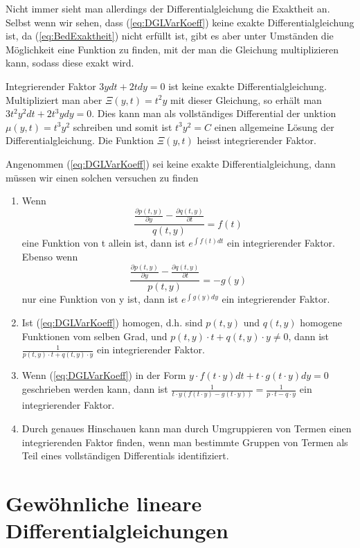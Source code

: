 Nicht immer sieht man allerdings der Differentialgleichung die Exaktheit an.
Selbst wenn wir sehen, dass (\ref{eq:DGLVarKoeff}) keine exakte
Differentialgleichung ist, da (\ref{eq:BedExaktheit}) nicht erfüllt ist, gibt
es aber unter Umständen die Möglichkeit eine Funktion zu finden, mit der man
die Gleichung multiplizieren kann, sodass diese exakt wird. 
\begin{note}{Integrierender Faktor}
  $3ydt+2tdy=0$ ist keine exakte Differentialgleichung. Multipliziert man aber
  $\Xi(y,t)=t^2y$ mit dieser Gleichung, so erhält man $3t^2y^2dt+2t^3ydy=0$.
  Dies kann man als vollständiges Differential der unktion $\mu(y,t)=t^3y^2$
  schreiben und somit ist $t^3y^2=C$ einen allgemeine Lösung der
  Differentialgleichung. Die Funktion $\Xi(y,t)$ heisst integrierender Faktor.
\end{note}
Angenommen (\ref{eq:DGLVarKoeff}) sei keine exakte Differentialgleichung, 
dann müssen wir einen solchen versuchen zu finden
\begin{enumerate}
    \item Wenn 
    \[\frac{\frac{\partial p(t,y)}{\partial y}-\frac{\partial q(t,y)}{\partial t}}{q(t,y)}=f(t)\] 
    eine Funktion von t allein ist, dann ist $e^{\int f(t)dt}$ ein integrierender Faktor. 
    Ebenso wenn
    \[\frac{\frac{\partial p(t,y)}{\partial y}-\frac{\partial q(t,y)}{\partial t}}{p(t,y)}=-g(y)\]
    nur eine Funktion von y ist, dann ist $e^{\int g(y)dy}$ ein integrierender Faktor.
    \item Ist (\ref{eq:DGLVarKoeff}) homogen, d.h. sind $p(t,y)$ und $q(t,y)$
      homogene Funktionen vom selben Grad, und $p(t,y)\cdot t+q(t,y)\cdot y\ne
      0$, dann ist $\frac{1}{p(t,y)\cdot t+q(t,y)\cdot y}$ ein integrierender
      Faktor.
    \item Wenn (\ref{eq:DGLVarKoeff}) in der Form $y\cdot f(t\cdot y)dt+t\cdot g(t\cdot y)dy=0$
    geschrieben werden kann, dann ist $\frac{1}{t\cdot y(f(t\cdot y)-g(t\cdot y))}=\frac{1}{p\cdot t-q\cdot y}$ ein integrierender Faktor.
    \item Durch genaues Hinschauen kann man durch Umgruppieren von Termen einen
      integrierenden Faktor finden, wenn man bestimmte Gruppen von Termen als
      Teil eines vollständigen Differentials identifiziert.
\end{enumerate}
%
\section{Gewöhnliche lineare Differentialgleichungen}
